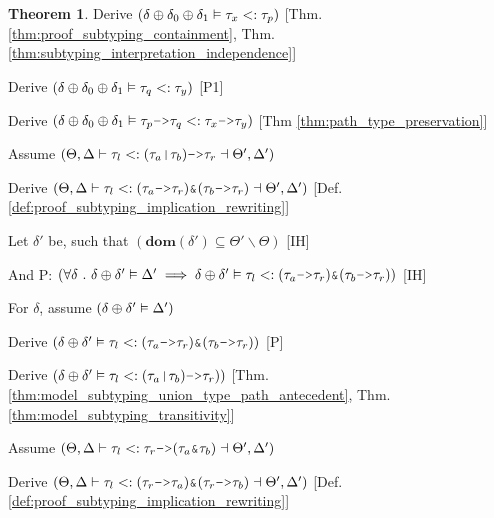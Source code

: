 \documentclass[acmsmall]{acmart}
\theoremstyle{definition}
\newtheorem{theorem}{Theorem}[section]
\begin{document}
\begin{theorem}
  \item \I\I \N Derive $(
    \delta \oplus \delta_0 \oplus \delta_1 \vDash \tau_x <: \tau_p
  )$ [Thm. \ref{thm:proof_subtyping_containment}, Thm. \ref{thm:subtyping_interpretation_independence}]

  \item \I\I \N Derive $(
    \delta \oplus \delta_0 \oplus \delta_1 \vDash \tau_q <: \tau_y
  )$ [P1]

  \item \I\I \N Derive $(
    \delta \oplus \delta_0 \oplus \delta_1 \satisfies \tau_p \J{->} \tau_q \subtypes \tau_x \J{->} \tau_y
  )$ [Thm \ref{thm:path_type_preservation}]


  \item \N Assume $(
      \Theta, \Delta \entails 
      \tau_l \subtypes 
      (\tau_a\J{|}\tau_b)\J{->}\tau_r
      \given \Theta', \Delta' 
  )$ 
  \item \I \N Derive $(
    \Theta, \Delta \entails 
    \tau_l \subtypes
    (\tau_a\J{->}\tau_r)\J{\&}(\tau_b\J{->}\tau_r)
    \given \Theta', \Delta'
  )$ [Def. \ref{def:proof_subtyping_implication_rewriting}]

  \item \I \N Let $\delta'$ be, such that $(
    \textbf{dom}(\delta') \subseteq \Theta' \backslash \Theta
  )$ [IH]
  \item \I \N And P: $(
    \forall \delta \qua 
    \delta \oplus \delta' \satisfies \Delta' 
    \implies 
    \delta \oplus \delta' \satisfies \tau_l \subtypes (\tau_a\J{->}\tau_r)\J{\&}(\tau_b\J{->}\tau_r) 
  )$ [IH]
  \item \I \N For $\delta$, assume $(\delta \oplus \delta' \vDash \Delta')$
  \item \I\I \N Derive $(
    \delta \oplus \delta' \satisfies \tau_l \subtypes (\tau_a\J{->}\tau_r)\J{\&}(\tau_b\J{->}\tau_r)
  )$ [P]
  \item \I\I \N Derive $(
    \delta \oplus \delta' \satisfies \tau_l \subtypes (\tau_a\J{|}\tau_b)\J{->}\tau_r)
  )$ [Thm. \ref{thm:model_subtyping_union_type_path_antecedent}, Thm. \ref{thm:model_subtyping_transitivity}]


  \item \N Assume $(
    \Theta, \Delta \entails 
    \tau_l \subtypes 
    \tau_r\J{->}(\tau_{a}\J{\&}\tau_{b})
    \given \Theta', \Delta'
  )$ 
  \item \I \N Derive $(
    \Theta, \Delta \entails 
    \tau_l
    \subtypes
    (\tau_r\J{->}\tau_a)
    \J{\&}
    (\tau_r\J{->}\tau_b)
    \given \Theta', \Delta' 
  )$ [Def. \ref{def:proof_subtyping_implication_rewriting}]


\end{theorem}
\end{document}
